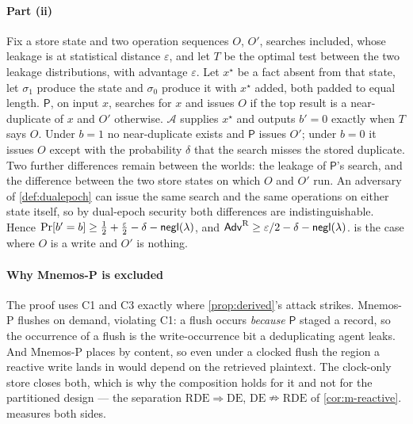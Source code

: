 \paragraph{Part (ii)} Fix a store state and two operation sequences $O$, $O'$, searches included,
whose leakage is at statistical distance $\varepsilon$, and let $T$ be the optimal test between the
two leakage distributions, with advantage $\varepsilon$. Let $x^\star$ be a fact absent from that
state, let $\sigma_1$ produce the state and $\sigma_0$ produce it with $x^\star$ added, both padded to
equal length. $\mathsf{P}$, on input $x$, searches for $x$ and issues $O$ if the top result is a
near-duplicate of $x$ and $O'$ otherwise. $\mathcal{A}$ supplies $x^\star$ and outputs $b'=0$ exactly
when $T$ says $O$. Under $b=1$ no near-duplicate exists and $\mathsf{P}$ issues $O'$; under $b=0$ it
issues $O$ except with the probability $\delta$ that the search misses the stored duplicate. Two
further differences remain between the worlds: the leakage of $\mathsf{P}$'s search, and the
difference between the two store states on which $O$ and $O'$ run. An adversary of
\cref{def:dualepoch} can issue the same search and the same operations on either state itself, so by
dual-epoch security both differences are indistinguishable. Hence $\Pr[b'=b] \ge \tfrac12 +
\tfrac{\varepsilon}{2} - \delta - \mathsf{negl}(\lambda)$, and $\mathsf{Adv}^{\mathrm{R}} \ge \varepsilon/2 - \delta -
\mathsf{negl}(\lambda)$.  is the case where $O$ is a write and $O'$ is nothing.

\paragraph{Why Mnemos-P is excluded} The proof uses C1 and C3 exactly where \cref{prop:derived}'s
attack strikes. Mnemos-P flushes on demand, violating C1: a flush occurs \emph{because} $\mathsf{P}$
staged a record, so the occurrence of a flush is the write-occurrence bit a deduplicating agent
leaks. And Mnemos-P places by content, so even under a clocked flush the region a reactive write
lands in would depend on the retrieved plaintext. The clock-only store closes both, which is why the
composition holds for it and not for the partitioned design --- the separation
$\mathrm{RDE}\Rightarrow\mathrm{DE}$, $\mathrm{DE}\nRightarrow\mathrm{RDE}$ of
\cref{cor:m-reactive}.  measures both sides.
